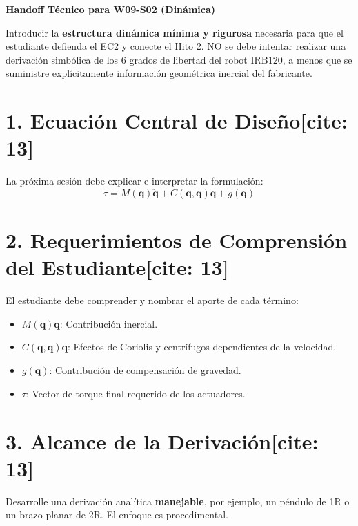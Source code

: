 \documentclass[11pt, a4paper]{article}
\begin{document}
\begin{center}
    \Large\textbf{\textcolor{ucbblue}{Handoff Técnico para W09-S02 (Dinámica)}}\\[0.2cm]
\end{center}

\begin{tcolorbox}[colback=red!5, colframe=red!70!black, title=\textbf{Objetivo Principal de W09-S02[cite: 13]}]
    Introducir la \textbf{estructura dinámica mínima y rigurosa} necesaria para que el estudiante defienda el EC2 y conecte el Hito 2. NO se debe intentar realizar una derivación simbólica de los 6 grados de libertad del robot IRB120, a menos que se suministre explícitamente información geométrica inercial del fabricante.
\end{tcolorbox}

\section*{1. Ecuación Central de Diseño[cite: 13]}
La próxima sesión debe explicar e interpretar la formulación:
\begin{equation*}
    \tau = M(\mathbf{q})\ddot{\mathbf{q}} + C(\mathbf{q}, \dot{\mathbf{q}})\dot{\mathbf{q}} + g(\mathbf{q})
\end{equation*}

\section*{2. Requerimientos de Comprensión del Estudiante[cite: 13]}
El estudiante debe comprender y nombrar el aporte de cada término:
\begin{itemize}
    \item $M(\mathbf{q})\ddot{\mathbf{q}}$: Contribución inercial.
    \item $C(\mathbf{q}, \dot{\mathbf{q}})\dot{\mathbf{q}}$: Efectos de Coriolis y centrífugos dependientes de la velocidad.
    \item $g(\mathbf{q})$: Contribución de compensación de gravedad.
    \item $\tau$: Vector de torque final requerido de los actuadores.
\end{itemize}

\section*{3. Alcance de la Derivación[cite: 13]}
Desarrolle una derivación analítica \textbf{manejable}, por ejemplo, un péndulo de 1R o un brazo planar de 2R. El enfoque es procedimental.
\end{document}
